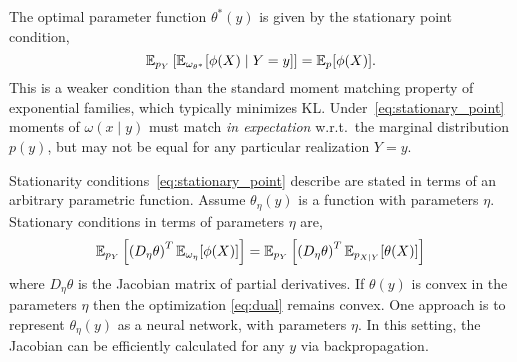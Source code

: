 The optimal parameter function $\theta^{*}(y)$ is given by the
stationary point condition,
\begin{equation}\label{eq:stationary_point}
  \mathbb{E}_{p_Y}\left[ \mathbb{E}_{\omega_{\theta^{*}}}[ \phi(X) \mid Y=y ] \right] = \mathbb{E}_p[\phi(X)].
\end{equation}
This is a weaker condition than the standard moment matching property
of exponential families, which typically minimizes KL.
Under~\eqref{eq:stationary_point} moments of $\omega(x\mid y)$ must
match \emph{in expectation} w.r.t.~the marginal distribution $p(y)$,
but may not be equal for any particular realization $Y=y$.


Stationarity conditions~\eqref{eq:stationary_point} describe are
stated in terms of an arbitrary parametric function.  Assume
$\theta_{\eta}(y)$ is a function with parameters $\eta$.  Stationary
conditions in terms of parameters $\eta$ are,
\begin{equation*}
  \mathbb{E}_{p_Y}\left[ \left( D_\eta \theta \right)^T \mathbb{E}_{\omega_\eta}[\phi(X)]
    \right]
    = \mathbb{E}_{p_Y}\left[ \left( D_\eta \theta \right)^T \mathbb{E}_{p_{X\mid
          Y}}[ \theta(X) ] \right]
\end{equation*}
where $D_\eta \theta$ is the Jacobian matrix of partial derivatives.
If $\theta(y)$ is convex in the parameters $\eta$ then the
optimization \EQN\eqref{eq:dual} remains convex.  One approach is to
represent $\theta_{\eta}(y)$ as a neural network, with parameters
$\eta$.  In this setting, the Jacobian can be efficiently calculated
for any $y$ via backpropagation.

